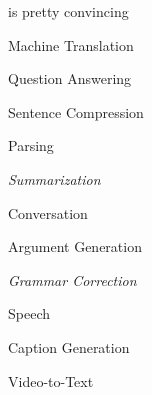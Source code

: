\documentclass{beamer}
\let\tempone\itemize
\let\temptwo\enditemize
\renewenvironment{itemize}{\tempone\addtolength{\itemsep}{0.5\baselineskip}}{\temptwo}
\newcommand{\air}{\vspace{0.25cm}}
\newcommand{\Cite}[1]{{\footnotesize \citep{#1}}}
\begin{document}
\begin{frame}{}
  \begin{center}
     is pretty convincing
  \end{center}

  \begin{itemize}
  \item Machine Translation \Cite{kalchbrenner2013recurrent,sutskever2014sequence, Cho2014, bahdanau2014neural,luong15effective} 
    \air

   
  \item Question Answering \Cite{Hermann2015}  

  \item Sentence Compression \Cite{filippova15sentence}
  \item Parsing \Cite{vinyals15grammar}
  \item \textit{Summarization} \Cite{Rush2015} 
  \item Conversation \Cite{Vinyals2015}
  \item Argument Generation \Cite{Wang}
  \item  \textit{Grammar Correction} \Cite{Schmaltz2016}
  \item Speech \Cite{Chorowski2015}
  \item Caption Generation \Cite{Xu2015}
  \item Video-to-Text \Cite{Venugopalan2015}

    \air 

  \end{itemize}
  
\end{frame}
\end{document}
